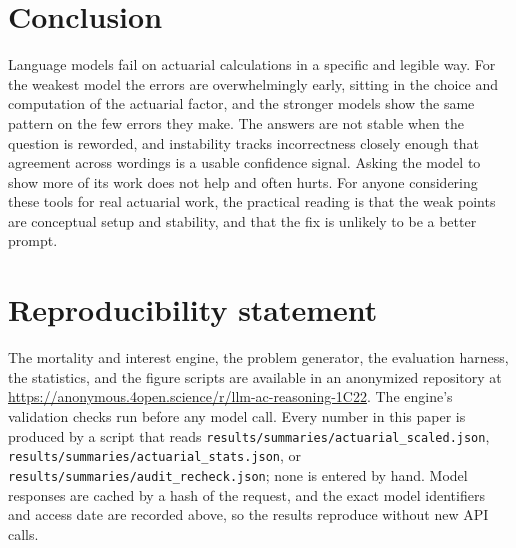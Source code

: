\documentclass{article}
\begin{document}
\section{Conclusion}
Language models fail on actuarial calculations in a specific and legible way. For the weakest model the errors are overwhelmingly early, sitting in the choice and computation of the actuarial factor, and the stronger models show the same pattern on the few errors they make. The answers are not stable when the question is reworded, and instability tracks incorrectness closely enough that agreement across wordings is a usable confidence signal. Asking the model to show more of its work does not help and often hurts. For anyone considering these tools for real actuarial work, the practical reading is that the weak points are conceptual setup and stability, and that the fix is unlikely to be a better prompt.

\section*{Reproducibility statement}
The mortality and interest engine, the problem generator, the evaluation harness, the statistics, and the figure scripts are available in an anonymized repository at \url{https://anonymous.4open.science/r/llm-ac-reasoning-1C22}. The engine's validation checks run before any model call. Every number in this paper is produced by a script that reads \texttt{results/summaries/actuarial\_scaled.json}, \texttt{results/summaries/actuarial\_stats.json}, or \texttt{results/summaries/audit\_recheck.json}; none is entered by hand. Model responses are cached by a hash of the request, and the exact model identifiers and access date are recorded above, so the results reproduce without new API calls.

\newpage


\end{document}
